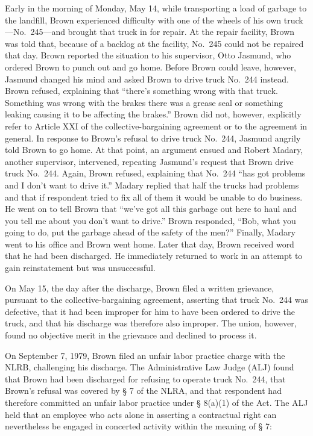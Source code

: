 \documentclass[
  letterpaper,
  11pt,
  DIV=9,
  openright]{scrbook}
\begin{document}
Early in the morning of Monday, May 14, while transporting a load of
garbage to the landfill, Brown experienced difficulty with one of the
wheels of his own truck---No.~245---and brought that truck in for
repair. At the repair facility, Brown was told that, because of a
backlog at the facility, No.~245 could not be repaired that day. Brown
reported the situation to his supervisor, Otto Jasmund, who ordered
Brown to punch out and go home. Before Brown could leave, however,
Jasmund changed his mind and asked Brown to drive truck No.~244 instead.
Brown refused, explaining that ``there's something wrong with that
truck. Something was wrong with the brakes there was a grease seal or
something leaking causing it to be affecting the brakes.'' Brown did
not, however, explicitly refer to Article XXI of the
collective-bargaining agreement or to the agreement in general. In
response to Brown's refusal to drive truck No.~244, Jasmund angrily told
Brown to go home. At that point, an argument ensued and Robert Madary,
another supervisor, intervened, repeating Jasmund's request that Brown
drive truck No.~244. Again, Brown refused, explaining that No.~244 ``has
got problems and I don't want to drive it.'' Madary replied that half
the trucks had problems and that if respondent tried to fix all of them
it would be unable to do business. He went on to tell Brown that ``we've
got all this garbage out here to haul and you tell me about you don't
want to drive.'' Brown responded, ``Bob, what you going to do, put the
garbage ahead of the safety of the men?'' Finally, Madary went to his
office and Brown went home. Later that day, Brown received word that he
had been discharged. He immediately returned to work in an attempt to
gain reinstatement but was unsuccessful.

On May 15, the day after the discharge, Brown filed a written grievance,
pursuant to the collective-bargaining agreement, asserting that truck
No.~244 was defective, that it had been improper for him to have been
ordered to drive the truck, and that his discharge was therefore also
improper. The union, however, found no objective merit in the grievance
and declined to process it.

On September 7, 1979, Brown filed an unfair labor practice charge with
the NLRB, challenging his discharge. The Administrative Law Judge (ALJ)
found that Brown had been discharged for refusing to operate truck
No.~244, that Brown's refusal was covered by § 7 of the NLRA, and that
respondent had therefore committed an unfair labor practice under §
8(a)(1) of the Act. The ALJ held that an employee who acts alone in
asserting a contractual right can nevertheless be engaged in concerted
activity within the meaning of § 7:
\end{document}
